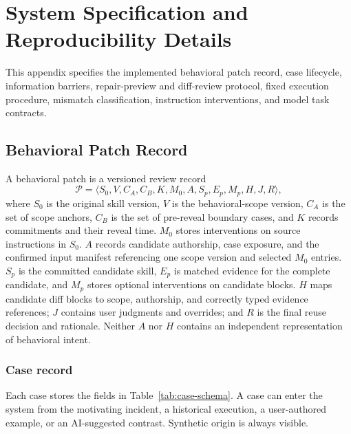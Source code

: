 \section{System Specification and Reproducibility Details}
\label{app:system-details}

This appendix specifies the implemented behavioral patch record, case lifecycle, information barriers, repair-preview and diff-review protocol, fixed execution procedure, mismatch classification, instruction interventions, and model task contracts.

\subsection{Behavioral Patch Record}
\label{app:patch-record}

A behavioral patch is a versioned review record
\[
\mathcal{P}=\langle S_0, V, C_A, C_B, K, M_0, A, S_p, E_p, M_p, H, J, R \rangle,
\]
where $S_0$ is the original skill version, $V$ is the behavioral-scope version, $C_A$ is the set of scope anchors, $C_B$ is the set of pre-reveal boundary cases, and $K$ records commitments and their reveal time. $M_0$ stores interventions on source instructions in $S_0$. $A$ records candidate authorship, case exposure, and the confirmed input manifest referencing one scope version and selected $M_0$ entries. $S_p$ is the committed candidate skill, $E_p$ is matched evidence for the complete candidate, and $M_p$ stores optional interventions on candidate blocks. $H$ maps candidate diff blocks to scope, authorship, and correctly typed evidence references; $J$ contains user judgments and overrides; and $R$ is the final reuse decision and rationale. Neither $A$ nor $H$ contains an independent representation of behavioral intent.

\subsubsection{Case record}
Each case stores the fields in Table~\ref{tab:case-schema}. A case can enter the system from the motivating incident, a historical execution, a user-authored example, or an AI-suggested contrast. Synthetic origin is always visible.

